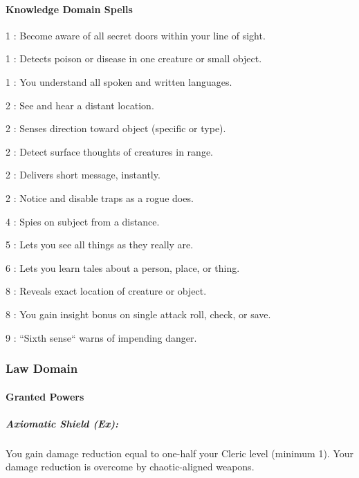 \paragraph{Knowledge Domain Spells}
\begin{list}{}{\leftmargin=1em}
\item[1] : Become aware of all secret doors within your line of sight.
\item[1] : Detects poison or disease in one creature or small object.
\item[1] : You understand all spoken and written languages.
\item[2] : See and hear a distant location.
\item[2] : Senses direction toward object (specific or type).
\item[2] : Detect surface thoughts of creatures in range.
\item[2] : Delivers short message, instantly.
\item[2] : Notice and disable traps as a rogue does.
\item[4] : Spies on subject from a distance.
\item[5] : Lets you see all things as they really are.
\item[6] : Lets you learn tales about a person, place, or thing.
\item[8] : Reveals exact location of creature or object.
\item[8] : You gain insight bonus on single attack roll, check, or save.
\item[9] : ``Sixth sense`` warns of impending danger.
\end{list}
\subsubsection{Law Domain}
\paragraph{Granted Powers}
\subparagraph{Axiomatic Shield (Ex):}
You gain damage reduction equal to one-half your Cleric level (minimum 1).
Your damage reduction is overcome by chaotic-aligned weapons.

